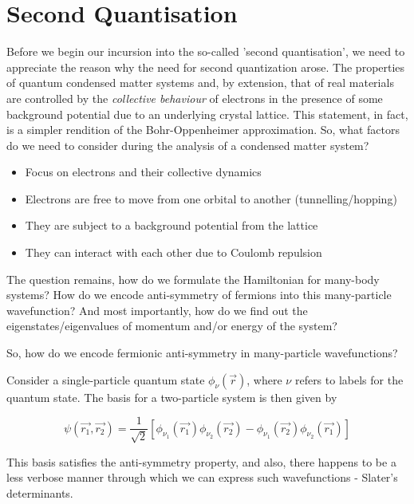 \chapter{Second Quantisation}

Before we begin our incursion into the so-called 'second quantisation', we need to appreciate the reason why the need for second quantization arose. The properties of quantum condensed matter systems and, by extension, that of real materials are controlled by the \textit{collective behaviour} of electrons in the presence of some background potential due to an underlying crystal lattice. This statement, in fact, is a simpler rendition of the Bohr-Oppenheimer approximation. So, what factors do we need to consider during the analysis of a condensed matter system?
\begin{itemize}
    \item Focus on electrons and their collective dynamics
    \item Electrons are free to move from one orbital to another (tunnelling/hopping)
    \item They are subject to a background potential from the lattice
    \item They can interact with each other due to Coulomb repulsion
\end{itemize}
The question remains, how do we formulate the Hamiltonian for many-body systems? How do we encode anti-symmetry of fermions into this many-particle wavefunction? And most importantly, how do we find out the eigenstates/eigenvalues of momentum and/or energy of the system?  \par

So, how do we encode fermionic anti-symmetry in many-particle wavefunctions? \par

Consider a single-particle quantum state $\phi_{\nu}(\vec{r})$, where $\nu$ refers to labels for the quantum state. The basis for a two-particle system is then given by 

\begin{equation*}
    \psi(\vec{r_{1}}, \vec{r_{2}}) = \frac{1}{\sqrt{2}}[\phi_{\nu_{1}}(\vec{r_{1}}) \phi_{\nu_{2}}(\vec{r_{2}}) - \phi_{\nu_{1}}(\vec{r_{2}}) \phi_{\nu_{2}}(\vec{r_{1}})]
\end{equation*}

This basis satisfies the anti-symmetry property, and also, there happens to be a less verbose manner through which we can express such wavefunctions - Slater's determinants. \par

